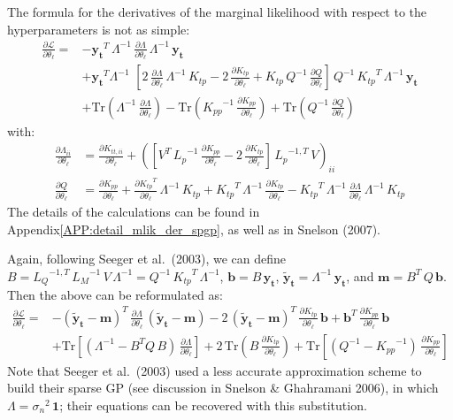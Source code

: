 \documentclass[11pt,a4paper]{article}
\newcommand\rapp[1]{Appendix\;\ref{#1}}
\newcommand{\tr}{\text{Tr}}
\numberwithin{equation}{section}
\begin{document}
The formula for the derivatives of the marginal likelihood with respect to the hyperparameters is not as simple:
\begin{align}
\frac{\partial \mathcal{L}}{\partial \theta_\ell} =
  &-\mathbf{y_t}^T\,\Lambda^{-1}\,\frac{\partial \Lambda}{\partial \theta_\ell}\,\Lambda^{-1}\,\mathbf{y_t} \nonumber \\
  &+\mathbf{y_t}^T\Lambda^{-1}\,\,\left[2\,\frac{\partial \Lambda}{\partial \theta_\ell}\,\Lambda^{-1}\,K_{tp} - 2\,\frac{\partial K_{tp}}{\partial \theta_\ell} + K_{tp}\,Q^{-1}\,\frac{\partial Q}{\partial \theta_\ell}\right]\,Q^{-1}\,{K_{tp}}^T\,\Lambda^{-1}\,\mathbf{y_t} \nonumber \\
  &+\tr\left(\Lambda^{-1}\,\frac{\partial \Lambda}{\partial \theta_\ell}\right) - \tr\left({K_{pp}}^{-1}\,\frac{\partial K_{pp}}{\partial \theta_\ell}\right) + \tr\left(Q^{-1}\,\frac{\partial Q}{\partial \theta_\ell}\right)
\end{align}
with:
\begin{align}
\frac{\partial \Lambda_{ii}}{\partial \theta_\ell} &= \frac{\partial K_{tt,ii}}{\partial \theta_\ell} + \left(\left[V^T\,{L_p}^{-1}\,\frac{\partial K_{pp}}{\partial \theta_\ell} - 2\,\frac{\partial K_{tp}}{\partial \theta_\ell}\right]\,{L_p}^{-1,T}\,V\right)_{ii} \label{EQ:spgp_dlambda} \\
\frac{\partial Q}{\partial \theta_\ell} &= \frac{\partial K_{pp}}{\partial \theta_\ell} + \frac{\partial {K_{tp}}^T}{\partial \theta_\ell}\,\Lambda^{-1}\,K_{tp} + {K_{tp}}^T\,\Lambda^{-1}\,\frac{\partial K_{tp}}{\partial \theta_\ell} - {K_{tp}}^T\,\Lambda^{-1}\,\frac{\partial \Lambda}{\partial \theta_\ell}\,\Lambda^{-1}\,K_{tp}
\end{align}
The details of the calculations can be found in \rapp{APP:detail_mlik_der_spgp}, as well as in Snelson (2007).

Again, following Seeger et al.~(2003), we can define $B = {L_Q}^{-1,T}\,{L_M}^{-1}\,V\,\Lambda^{-1} = Q^{-1}\,{K_{tp}}^T\,\Lambda^{-1}$, $\mathbf{b} = B\,\mathbf{y_t}$, $\mathbf{\tilde{y}_t} = \Lambda^{-1}\,\mathbf{y_t}$, and $\mathbf{m} = B^T\,Q\,\mathbf{b}$. Then the above can be reformulated as:
\begin{align}
\frac{\partial \mathcal{L}}{\partial \theta_\ell} =
  &-(\mathbf{\tilde{y}_t} - \mathbf{m})^T\,\frac{\partial \Lambda}{\partial \theta_\ell}\,(\mathbf{\tilde{y}_t} - \mathbf{m}) - 2\,(\mathbf{\tilde{y}_t} - \mathbf{m})^T\,\frac{\partial K_{tp}}{\partial \theta_\ell}\,\mathbf{b} + \mathbf{b}^T\,\frac{\partial K_{pp}}{\partial \theta_\ell}\,\mathbf{b} \nonumber \\
  & + \tr\left[\left(\Lambda^{-1} - B^T Q\,B\right)\,\frac{\partial \Lambda}{\partial \theta_\ell}\right] + 2\,\tr\left(B\,\frac{\partial K_{tp}}{\partial \theta_\ell}\right) + \tr\left[\left(Q^{-1} - {K_{pp}}^{-1}\right)\,\frac{\partial K_{pp}}{\partial \theta_\ell}\right]
\end{align}
Note that Seeger et al.~(2003) used a less accurate approximation scheme to build their sparse GP (see discussion in Snelson \& Ghahramani 2006), in which $\Lambda = {\sigma_n}^{2}\,{\bm 1}$; their equations can be recovered with this substitution.
\end{document}
